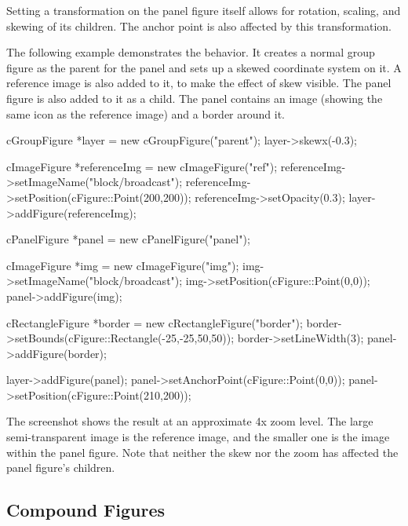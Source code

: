 Setting a transformation on the panel figure itself allows for rotation,
scaling, and skewing of its children. The anchor point is also affected by this
transformation.

The following example demonstrates the  behavior. It
creates a normal group figure as the parent for the panel and sets up a
skewed coordinate system on it. A reference image is also added to it,
to make the effect of skew visible. The panel figure is also
added to it as a child. The panel contains an image (showing the same icon
as the reference image) and a border around it.

\begin{cpp}
cGroupFigure *layer = new cGroupFigure("parent");
layer->skewx(-0.3);

cImageFigure *referenceImg = new cImageFigure("ref");
referenceImg->setImageName("block/broadcast");
referenceImg->setPosition(cFigure::Point(200,200));
referenceImg->setOpacity(0.3);
layer->addFigure(referenceImg);

cPanelFigure *panel = new cPanelFigure("panel");

cImageFigure *img = new cImageFigure("img");
img->setImageName("block/broadcast");
img->setPosition(cFigure::Point(0,0));
panel->addFigure(img);

cRectangleFigure *border = new cRectangleFigure("border");
border->setBounds(cFigure::Rectangle(-25,-25,50,50));
border->setLineWidth(3);
panel->addFigure(border);

layer->addFigure(panel);
panel->setAnchorPoint(cFigure::Point(0,0));
panel->setPosition(cFigure::Point(210,200));
\end{cpp}


The screenshot shows the result at an approximate 4x zoom level. The large
semi-transparent image is the reference image, and the smaller one is the image within the panel
figure. Note that neither the skew nor the zoom has affected the panel figure's children.

\begin{center}
\end{center}


\subsection{Compound Figures}
\label{sec:graphics:compound-figures}

